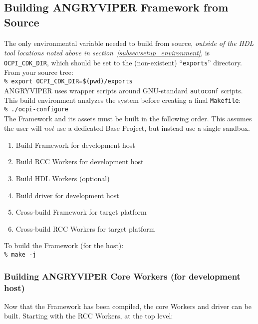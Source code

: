 \begin{appendices}
\subsection{Building ANGRYVIPER Framework from Source}
\label{subsec:building_angry_viper_fw_source}
The only environmental variable needed to build from source, \textit{outside of the HDL tool locations noted above in section~\ref{subsec:setup_environment}}, is \verb+OCPI_CDK_DIR+, which should be set to the (non-existent) ``\texttt{exports}'' directory. From your source tree:\\

\verb+% export OCPI_CDK_DIR=$(pwd)/exports+\\

ANGRYVIPER uses wrapper scripts around GNU-standard \texttt{autoconf} scripts. This build environment analyzes the system before creating a final \texttt{Makefile}:\\

\verb+% ./ocpi-configure+\\

The Framework and its assets must be built in the following order. This assumes the user will \textit{not} use a dedicated Base Project, but instead use a single sandbox.
\begin{enumerate}
\item Build Framework for development host
\item Build RCC Workers for development host
\item Build HDL Workers (optional)
\item Build driver for development host
\item Cross-build Framework for target platform
\item Cross-build RCC Workers for target platform
\end{enumerate}
\par
To build the Framework (for the host):\\

\verb+% make -j+\\

\subsubsection{Building ANGRYVIPER Core Workers (for development host)}
Now that the Framework has been compiled, the core Workers and driver can be built. Starting with the RCC Workers, at the top level:\\


\end{appendices}
